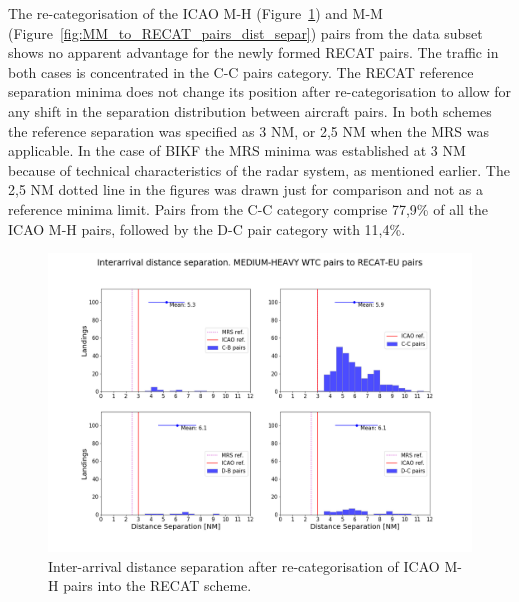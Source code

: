 The re-categorisation of  the ICAO M-H (Figure~\ref{fig:MH_to_RECAT_pairs_dist_separ}) and M-M (Figure~\ref{fig:MM_to_RECAT_pairs_dist_separ}) pairs from the data subset shows no apparent advantage for the newly formed RECAT pairs. The traffic in both cases is concentrated in the C-C pairs category. The RECAT reference separation minima does not change its position after re-categorisation to allow for any shift in the separation distribution between aircraft pairs. In both schemes the reference separation was specified as 3 NM, or 2,5 NM when the MRS was applicable. In the case of BIKF the MRS minima was established at 3 NM because of technical characteristics of the radar system, as mentioned earlier. The 2,5 NM dotted line in the figures was drawn just for comparison and not as a reference minima limit.  Pairs from the C-C category comprise 77,9\% of all the ICAO M-H pairs, followed by the D-C pair category with 11,4\%.
\begin{figure}[h]
    \centering
    \includegraphics[width=1\textwidth]{graphics/fig_MH_to_RECAT_pairs_dist_separ.png}
    \caption[Inter-arrival distance separation of ICAO M-H pairs into the RECAT scheme]{Inter-arrival distance separation after re-categorisation of ICAO M-H pairs into the RECAT scheme.}
    \label{fig:MH_to_RECAT_pairs_dist_separ}
\end{figure}

